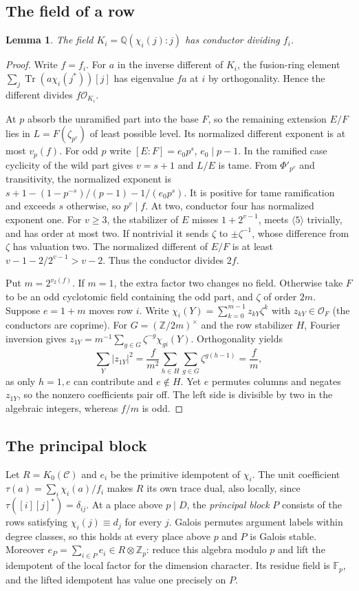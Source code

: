 \documentclass[11pt]{amsart}
\numberwithin{equation}{section}
\newtheorem{lemma}[theorem]{Lemma}
\DeclareMathOperator{\Tr}{Tr}
\newcommand{\QQ}{\mathbb Q}
\newcommand{\ZZ}{\mathbb Z}
\newcommand{\C}{\mathcal C}
\begin{document}
\subsection{The field of a row}
\begin{lemma}\label{conduct}
The field $K_i=\QQ(\chi_i(j):j)$ has conductor dividing $f_i$.
\end{lemma}
\begin{proof}
Write $f=f_i$. For $a$ in the inverse different of $K_i$, the fusion-ring
element $\sum_j\Tr(a\chi_i(j^*))[j]$ has eigenvalue $fa$ at $i$ by
orthogonality. Hence the different divides $f\mathcal O_{K_i}$.

At $p$ absorb the unramified part into the base $F$, so the remaining
extension $E/F$ lies in $L=F(\zeta_{p^v})$ of least possible level.
Its normalized different exponent is at most $v_p(f)$. For odd $p$ write
$[E:F]=e_0p^s$, $e_0\mid p-1$. In the ramified case cyclicity of the
wild part gives $v=s+1$ and $L/E$ is tame. From $\Phi'_{p^v}$ and
transitivity, the normalized exponent is
$s+1-(1-p^{-s})/(p-1)-1/(e_0p^s)$. It is positive for tame
ramification and exceeds $s$ otherwise, so $p^v\mid f$.
At two, conductor four has normalized exponent one. For $v\ge3$, the
stabilizer of $E$ misses $1+2^{v-1}$, meets $\langle5\rangle$ trivially,
and has order at most two. If nontrivial it sends $\zeta$ to
$\pm\zeta^{-1}$, whose difference from $\zeta$ has valuation two.
The normalized different of $E/F$ is at least
$v-1-2/2^{v-1}>v-2$. Thus the conductor divides $2f$.

Put $m=2^{v_2(f)}$. If $m=1$, the extra factor two changes no field.
Otherwise take $F$ to be an odd cyclotomic field containing the odd part,
and $\zeta$ of order $2m$. Suppose $e=1+m$ moves row $i$.
Write $\chi_i(Y)=\sum_{k=0}^{m-1}z_{kY}\zeta^k$ with
$z_{kY}\in\mathcal O_F$ (the conductors are coprime). For
$G=(\ZZ/2m)^\times$ and the row stabilizer $H$, Fourier inversion gives
$z_{1Y}=m^{-1}\sum_{g\in G}\zeta^{-g}\chi_{gi}(Y)$. Orthogonality yields
\[
 \sum_Y|z_{1Y}|^2=\frac f{m^2}\sum_{h\in H}\sum_{g\in G}\zeta^{g(h-1)}
 =\frac f m ,
\]
as only $h=1,e$ can contribute and $e\notin H$. Yet $e$ permutes columns
and negates $z_{1Y}$, so the nonzero coefficients pair off. The left side
is divisible by two in the algebraic integers, whereas $f/m$ is odd.
\end{proof}

\subsection{The principal block}\label{blk:principal}
Let $R=K_0(\C)$ and $e_i$ be the primitive idempotent of $\chi_i$.
The unit coefficient $\tau(a)=\sum_i\chi_i(a)/f_i$ makes $R$ its own
trace dual, also locally, since $\tau([i][j]^*)=\delta_{ij}$.
At a place above $p\mid D$, the \emph{principal block} $P$ consists of the
rows satisfying $\chi_i(j)\equiv d_j$ for every $j$. Galois permutes
argument labels within degree classes, so this holds at every place above
$p$ and $P$ is Galois stable. Moreover $e_P=\sum_{i\in P}e_i\in
R\otimes\ZZ_p$: reduce this algebra modulo $p$ and lift the idempotent
of the local factor for the dimension character. Its residue field is
$\mathbb F_p$, and the lifted idempotent has value one precisely on $P$.
\end{document}
